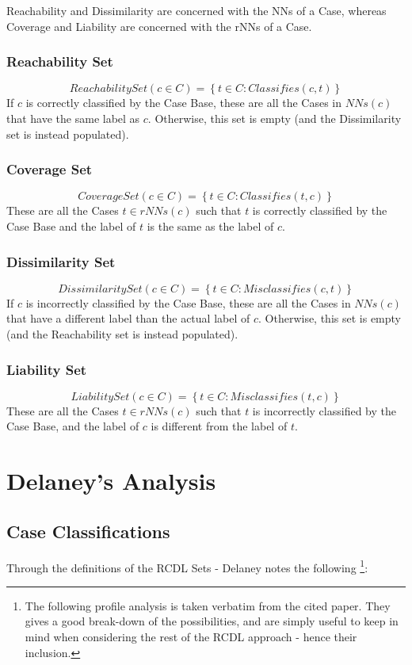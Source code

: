 \documentclass[a4paper,11pt]{report}
\begin{document}
Reachability and Dissimilarity are concerned with the NNs of a Case, whereas Coverage and Liability are concerned with the rNNs of a Case.

\subsubsection{Reachability Set}
\[ ReachabilitySet(c \in C) = \left\lbrace t \in C : Classifies(c, t) \right\rbrace \] 
If $c$ is correctly classified by the Case Base, these are all the Cases in $ NNs(c) $ that have the same label as $c$. Otherwise, this set is empty (and the Dissimilarity set is instead populated).

\subsubsection{Coverage Set}
\[ CoverageSet(c \in C) = \left\lbrace t \in C : Classifies(t, c) \right\rbrace \]
These are all the Cases $ t \in rNNs(c) $ such that $t$ is correctly classified by the Case Base and the label of $t$ is the same as the label of $c$.

\subsubsection{Dissimilarity Set}
\[ DissimilaritySet(c \in C) = \left\lbrace t \in C : Misclassifies(c, t) \right\rbrace \]  
If $c$ is incorrectly classified by the Case Base, these are all the Cases in $ NNs(c) $ that have a different label than the actual label of $c$. Otherwise, this set is empty (and the Reachability set is instead populated).

\subsubsection{Liability Set}
\[ LiabilitySet(c \in C) = \left\lbrace t \in C : Misclassifies(t, c) \right\rbrace \]  
These are all the Cases $ t \in rNNs(c) $ such that $t$ is incorrectly classified by the Case Base, and the label of $c$ is different from the label of $t$.

\section{Delaney's Analysis}

\subsection{Case Classifications}
Through the definitions of the RCDL Sets - Delaney notes the following \citep{Delany2009}\footnote{The following profile analysis is taken verbatim from the cited paper. They gives a good break-down of the possibilities, and are simply useful to keep in mind when considering the rest of the RCDL approach - hence their inclusion.}:
\end{document}
